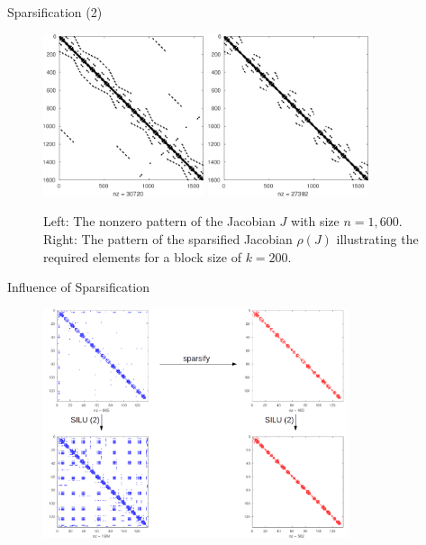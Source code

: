 \documentclass{beamer}
\newcommand{\sparsifysymbol}{\ensuremath{\rho}}
\newcommand{\sparsify}[1]{\ensuremath{\sparsifysymbol(#1)}}
\begin{document}
\begin{frame}{Sparsification (2)}
\begin{figure}
\centering
\includegraphics[width=0.42\textwidth]{quadflow}
\hfill
\includegraphics[width=0.42\textwidth]{block200}

\caption{Left: The nonzero pattern of the Jacobian $J$ with size $n=1,600$. 
Right: The pattern of the
sparsified Jacobian $\sparsify{J}$ illustrating the required elements for a block size of
$k=200$.}
\end{figure}
\end{frame}

\begin{frame}{Influence of Sparsification}
\begin{figure}
\centering
\includegraphics[width=0.8\textwidth]{sparsify}
\end{figure}
\end{frame}
\end{document}
